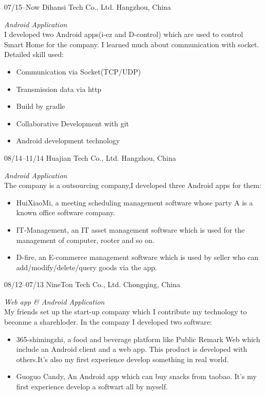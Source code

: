 \documentclass[]{friggeri-cv} %
\begin{document}
\begin{entrylist}


\entry
{07/15--Now}
{Dihansi Tech Co., Ltd.}
{Hangzhou, China}
{\emph{Android Application} \\
    I developed two Android apps(i-ez and D-control) which are used to control Smart Home for the company.
I learned much about communication with socket.\\
Detailed skill used:
\begin{itemize}
    \item Communication via Socket(TCP/UDP)
    \item Transmission data via http
    \item Build by gradle
    \item Collaborative Development with git
    \item Android development technology
\end{itemize}}

\entry
{08/14--11/14}
{Huajian Tech Co., Ltd.}
{Hangzhou, China}
{\emph{Android Application} \\
    The company is a outsourcing company,I developed three Android apps for them:
\begin{itemize}
    \item HuiXiaoMi, a meeting scheduling management software whose party A is a known office software company.
    \item IT-Management, an IT asset management software which is used for the management of computer, rooter and so on.
    \item D-fire, an E-commerce management software which is used by seller who can add/modify/delete/query goods via the app.
\end{itemize}}

\entry
{08/12--07/13}
{NineTon Tech Co., Ltd.}
{Chongqing, China}
{\emph{Web app \& Android Application} \\
    My friends set up the start-up company which I contribute my technology to beconme a sharehloder.
    In the company I developed two software:
    \begin{itemize}
        \item 365-shimingzhi, a food and beverage platform like Public Remark Web which include an Android client and a web app. This product is developed with others.It's also my first experience develop something in real world.
        \item Guoguo Candy, An Android app which can buy snacks from taobao.  It's my first experience develop a softwart all by myself.
    \end{itemize}}


\end{entrylist}
\end{document}
